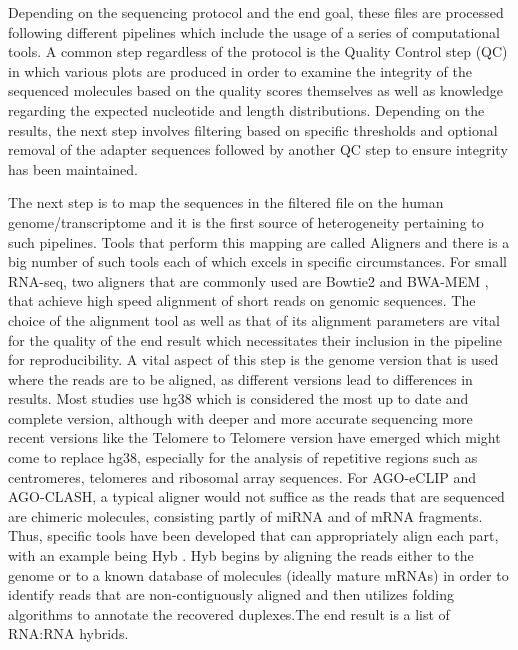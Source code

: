 \documentclass[en,ack]{dimscthesis}
\begin{document}
\par Depending on the sequencing protocol and the end goal, these files are processed following different pipelines which include the usage of a series of computational tools. A common step regardless of the protocol is the Quality Control step (QC) in which various plots are produced in order to examine the integrity of the sequenced molecules based on the quality scores themselves as well as knowledge regarding the expected nucleotide and length distributions. Depending on the results, the next step involves filtering based on specific thresholds and optional removal of the adapter sequences followed by another QC step to ensure integrity has been maintained.

\par The next step is to map the sequences in the filtered file on the human genome/transcriptome and it is the first source of heterogeneity pertaining to such pipelines. Tools that perform this mapping are called Aligners and there is a big number of such tools each of which excels in specific circumstances. For small RNA-seq, two aligners that are commonly used are Bowtie2 and BWA-MEM \parencite{langmeadUltrafastMemoryefficientAlignment2009,liAligningSequenceReads2013}, that achieve high speed alignment of short reads on genomic sequences. The choice of the alignment tool as well as that of its alignment parameters are vital for the quality of the end result which necessitates their inclusion in the pipeline for reproducibility. A vital aspect of this step is the genome version that is used where the reads are to be aligned, as different versions lead to differences in results. Most studies use hg38 which is considered the most up to date and complete version, although with deeper and more accurate sequencing more recent versions like the Telomere to Telomere version have emerged which might come to replace hg38, especially for the analysis of repetitive regions such as centromeres, telomeres and ribosomal array sequences. For AGO-eCLIP and AGO-CLASH, a typical aligner would not suffice as the reads that are sequenced are chimeric molecules, consisting partly of miRNA and of mRNA fragments. Thus, specific tools have been developed that can appropriately align each part, with an example being Hyb \parencite{travisHybBioinformaticsPipeline2014}. Hyb begins by aligning the reads either to the genome or to a known database of molecules (ideally mature mRNAs) in order to identify reads that are non-contiguously aligned and then utilizes folding algorithms to annotate the recovered duplexes.The end result is a list of RNA:RNA hybrids.
\end{document}

